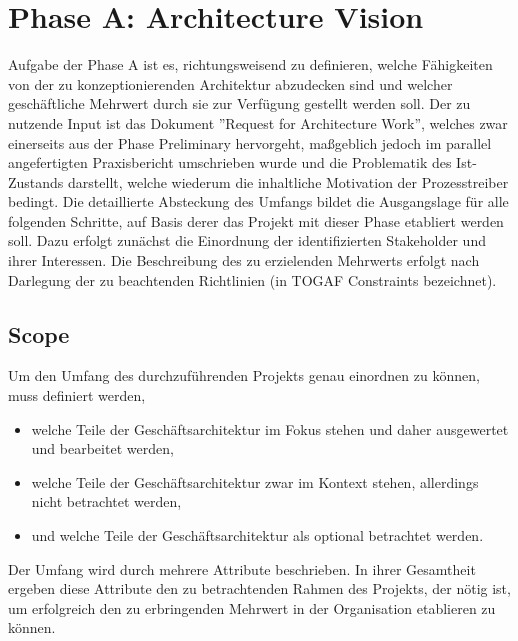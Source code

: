 \section{Phase A: Architecture Vision}
Aufgabe der Phase A ist es, richtungsweisend zu definieren, welche Fähigkeiten von der zu konzeptionierenden Architektur abzudecken sind und welcher geschäftliche Mehrwert durch sie zur Verfügung gestellt werden soll.
Der zu nutzende Input ist das Dokument ''Request for Architecture Work'', welches zwar einerseits aus der Phase Preliminary hervorgeht, maßgeblich jedoch im parallel angefertigten Praxisbericht umschrieben wurde und die Problematik des Ist-Zustands darstellt, welche wiederum die inhaltliche Motivation der Prozesstreiber bedingt.
Die detaillierte Absteckung des Umfangs bildet die Ausgangslage für alle folgenden Schritte, auf Basis derer das Projekt mit dieser Phase etabliert werden soll.
Dazu erfolgt zunächst die Einordnung der identifizierten Stakeholder und ihrer Interessen.
Die Beschreibung des zu erzielenden Mehrwerts erfolgt nach Darlegung der zu beachtenden Richtlinien (in TOGAF Constraints bezeichnet).

\subsection{Scope}
Um den Umfang des durchzuführenden Projekts genau einordnen zu können, muss definiert werden, 
\begin{itemize}
\setlength\itemsep{-0.2em}
\item{welche Teile der Geschäftsarchitektur  im Fokus stehen und daher ausgewertet und bearbeitet werden,}
\item{welche Teile der Geschäftsarchitektur zwar im Kontext stehen, allerdings nicht betrachtet werden,}
\item{und welche Teile der Geschäftsarchitektur als optional betrachtet werden.}
\end{itemize}

Der Umfang wird durch mehrere Attribute beschrieben. 
In ihrer Gesamtheit ergeben diese Attribute den zu betrachtenden Rahmen des Projekts, der nötig ist, um erfolgreich den zu erbringenden Mehrwert in der Organisation etablieren zu können.

